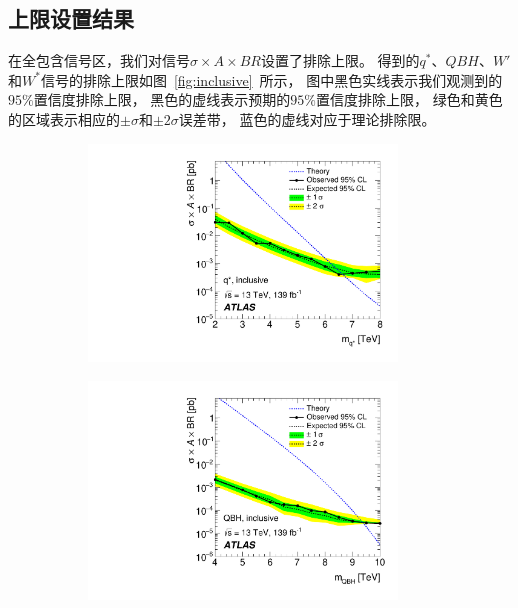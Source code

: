 \subsection{上限设置结果} 
\label{sec:DijetSig2}

在全包含信号区，我们对信号$\sigma\times A \times BR$设置了排除上限。
得到的$q^*$、$QBH$、$W'$和$W^*$信号的排除上限如图~\ref{fig:inclusive}~所示，
图中黑色实线表示我们观测到的$95\%$置信度排除上限，
黑色的虚线表示预期的$95\%$置信度排除上限，
绿色和黄色的区域表示相应的$\pm \sigma$和$\pm 2\sigma$误差带，
蓝色的虚线对应于理论排除限。

\begin{figure}[!thbp]
  \begin{subfigure}{.5\textwidth}
  \centering
  \includegraphics[width=0.9\textwidth]{figs/fig_04a.pdf}
  \caption{}
  \end{subfigure}
  \begin{subfigure}{.5\textwidth}
  \centering
  \includegraphics[width=0.9\textwidth]{figs/fig_04b.pdf}

\end{subfigure}
\end{figure}
